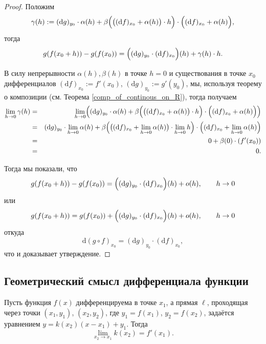 \begin{proof}
Положим
\[
 \gamma(h): = (\mathrm{d}g)_{ y_0} \cdot \alpha( h)  + \beta\Bigl( \bigl( (\mathrm{d}f)_{x_0}+ \alpha(h) \bigr) \cdot h \Bigr) \cdot \Bigl(  (\mathrm{d}f)_{x_0} + \alpha(h) \Bigr),
\]
тогда
\[
  g(f(x_0 +h )) -g(f(x_0)) = \Bigl((\mathrm{d}g)_{y_0 } \cdot (\mathrm{d}f)_{x_0}\Bigr) (h) + \gamma(h)\cdot h.
\]

В силу непрерывности $\alpha(h), \beta(h)$ в точке $h=0$ и существования в точке $x_0$ дифференциалов $(\mathrm{d}f)_{x_0}:=f'(x_0)$, $(\mathrm{d}g)_{y_0}:=g'(y_0)$, мы, используя теорему о композиции (см. Теорема \ref{comp_of_continous_on_R}), тогда получаем
\begin{eqnarray*}
 \lim_{h \to 0} \gamma(h) &=& \lim_{h\to 0} \Bigl( (\mathrm{d}g)_{ y_0} \cdot \alpha( h)  + \beta\Bigl( \bigl( (\mathrm{d}f)_{x_0}+ \alpha(h) \bigr) \cdot h \Bigr) \cdot \Bigl(  (\mathrm{d}f)_{x_0} + \alpha(h) \Bigr) \Bigr) \\
 &=& (\mathrm{d}g)_{ y_0} \cdot \lim_{h\to 0} \alpha( h)  + \beta\Bigl( \bigl( (\mathrm{d}f)_{x_0}+  \lim_{h\to 0}\alpha(h) \bigr) \cdot \lim_{h\to 0} h \Bigr) \cdot \Bigl(  (\mathrm{d}f)_{x_0} + \lim_{h\to 0}\alpha(h) \Bigr) \\
 &=& 0 + \beta(0)\cdot (f'(x_0))\\
 &=& 0.
\end{eqnarray*}

Тогда мы показали, что
\[
 g(f(x_0 +h )) -g(f(x_0)) =\Bigl((\mathrm{d}g)_{y_0 } \cdot (\mathrm{d}f)_{x_0}\Bigr) (h) + o(h), \qquad h \to 0 
\]
или
\[
 g(f(x_0 +h ))  = g(f(x_0))+\Bigl((\mathrm{d}g)_{y_0 } \cdot (\mathrm{d}f)_{x_0}\Bigr) (h) + o(h), \qquad h \to 0
\]
откуда
\[
\mathrm{d}(g\circ f)_{x_0} = (\mathrm{d}g)_{y_0 } \cdot (\mathrm{d}f)_{x_0},
\]
что и доказывает утверждение.
\end{proof}



\subsection{Геометрический смысл дифференциала функции}



\begin{theorem}
    Пусть функция $f(x)$ дифференцируема в точке $x_1$, а прямая $\ell$, проходящая через точки $(x_1,y_1)$, $(x_2,y_2)$, где $y_1 = f(x_1)$, $y_2 = f(x_2)$, задаётся уравнением $y = k(x_2) (x - x_1 ) + y_1$. Тогда
    \[
     \lim_{x_2 \to x_1} k(x_2) = f'(x_1).
    \]
\end{theorem}
  
